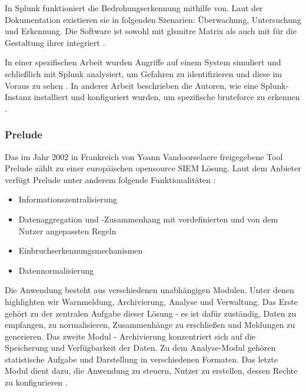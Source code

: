 In Splunk funktioniert die Bedrohungserkennung mithilfe von. Laut der Dokumentation existieren sie in folgenden Szenarien: Überwachung, Untersuchung und Erkennung. Die Software ist sowohl mit gls{mitre} Matrix als auch mit  für die Gestaltung ihrer  integriert \citep{Splunk_usecases}. 

In einer spezifischen Arbeit wurden Angriffe auf einem System simuliert und schließlich mit Splunk analysiert, um Gefahren zu identifizieren und diese im Voraus zu sehen \citep{Su_SplunkDDOS}. In anderer Arbeit beschrieben die Autoren, wie eine Splunk-Instanz installiert und konfiguriert wurden, um spezifische \gls{bruteforce} zu erkennen \citep{Selvaganesh_SplunkBruteForce}.
 





\subsubsection{Prelude}
Das im Jahr 2002 in Frankreich von Yoann Vandoorselaere freigegebene Tool Prelude zählt zu einer europäischen \gls{opensource} \gls{SIEM} Lösung. Laut dem Anbieter verfügt Prelude unter anderem folgende Funktionalitäten \citep{Prelude_SIEM}: 

\begin{itemize}[noitemsep]
   \item	Informationszentralisierung 
   \item	Datenaggregation und -Zusammenhang mit vordefinierten und von dem Nutzer angepassten Regeln 
   \item	Einbruchserkennungsmechanismen 
   \item	Datennormalisierung 
\end{itemize}

Die Anwendung besteht aus verschiedenen unabhängigen Modulen. Unter denen highlighten wir Warnmeldung, Archivierung, Analyse und Verwaltung. Das Erste gehört zu der zentralen Aufgabe dieser Lösung - es ist dafür zuständig, Daten zu empfangen, zu normalisieren, Zusammenhänge zu erschließen und Meldungen zu generieren. Das zweite Modul - Archivierung konzentriert sich auf die Speicherung und Verfügbarkeit der Daten. Zu dem Analyse-Modul gehören statistische Aufgabe und Darstellung in verschiedenen Formaten. Das letzte Modul dient dazu, die Anwendung zu steuern, Nutzer zu erstellen, dessen Rechte zu konfigurieren \citep{EC_Prelude}. 

